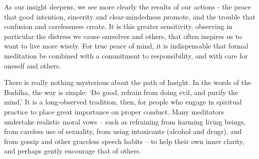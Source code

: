 
As our insight deepens, we see more clearly the results of our actions -
the peace that good intention, sincerity and clear-mindedness promote,
and the trouble that confusion and carelessness create. It is this
greater sensitivity, observing in particular the distress we cause
ourselves and others, that often inspires us to want to live more
wisely. For true peace of mind, it is indispensable that formal
meditation be combined with a commitment to responsibility, and with
care for oneself and others.

There is really nothing mysterious about the path of Insight. In the
words of the Buddha, the way is simple: `Do good, refrain from doing
evil, and purify the mind.' It is a long-observed tradition, then, for
people who engage in spiritual practice to place great importance on
proper conduct. Many meditators undertake realistic moral vows -- such as
refraining from harming living beings, from careless use of sexuality,
from using intoxicants (alcohol and drugs), and from gossip and other
graceless speech habits -- to help their own inner clarity, and perhaps
gently encourage that of others.
